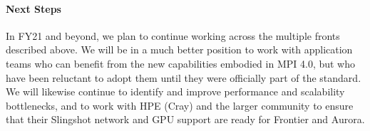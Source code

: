 \paragraph{Next Steps}
In FY21 and beyond, we plan to continue working across the multiple fronts described above.  We will be in a much better position to work with application teams who can benefit from the new capabilities embodied in MPI 4.0, but who have been reluctant to adopt them until they were officially part of the standard.  We will likewise continue to identify and improve performance and scalability bottlenecks, and to work with HPE (Cray) and the larger community to ensure that their Slingshot network and GPU support are ready for Frontier and Aurora.
